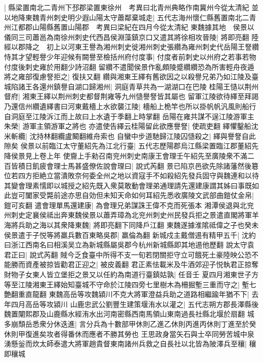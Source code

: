 |{
	縣梁置南北二青州下邳郡梁置東徐州　考異曰北青州典略作南冀州今從太清紀}
並以地降東魏青州刺史明少遐山陽太守蕭鄰棄城走|{
	五代志海州懷仁縣舊置南北二青州江都郡山陽縣舊置山陽郡　考異曰梁紀在四月今從太清紀}
東魏據其地　侯景以儀同三司蕭邕為南徐州刺史代西昌侯淵藻鎮京口又遣其將徐相攻晉陵|{
	將即亮翻}
陸經以郡降之　初上以河東王譽為湘州刺史徙湘州刺史張纘為雍州刺史代岳陽王詧纘恃其才望輕譽少年迎候有闕譽至檢括州府付度事|{
	付度者前刺史以州府之若事若物付度後刺史雍於用翻少詩沼翻}
留纘不遣聞侯景作亂頗陵蹙纘纘恐為所害輕舟夜遁將之雍部復慮詧拒之|{
	復扶又翻}
纘與湘東王繹有舊欲因之以殺譽兄弟乃如江陵及臺城陷諸王各還州鎮譽自湖口歸湘州|{
	洞庭青草共為一湖湖口在巴陵}
桂陽王慥以荆州督府|{
	湘東王繹以荆州刺史都督荆雍等九州慥譽詧皆其屬也}
留軍江陵欲待繹至拜謁乃還信州纘遺繹書曰河東戴檣上水欲襲江陵|{
	檣船上桅竿也所以掛帆帆汎風則船行自洞庭至江陵泝江而上故曰上水遺于季翻上時掌翻}
岳陽在雍共謀不逞江陵游軍主朱榮|{
	游軍主領游軍之將也}
亦遣使告繹云桂陽留此欲應譽詧|{
	使疏吏翻}
繹懼鑿船沈米斬纜|{
	沈持林翻纜盧闞翻維舟索也}
自蠻中步道馳歸江陵囚慥殺之|{
	繹與譽詧自此隙矣}
侯景以前臨江太守董紹先為江北行臺|{
	五代志歷陽郡烏江縣梁置臨江郡董紹先降侯景見上卷上年}
使齎上手勑召南兖州刺史南康王會理壬午紹先至廣陵衆不滿二百皆積日飢疲會理士馬甚盛僚佐說會理曰|{
	說式芮翻}
景已陷京邑欲先除諸藩然後簒位若四方拒絶立當潰敗奈何委全州之地以資寇手不如殺紹先發兵固守與魏連和以待其變會理素懦即以城授之紹先既入衆莫敢動會理弟通理請先還建康謂其姊曰事既如此豈可闔家受斃前途亦思自効但未知天命如何耳紹先悉收廣陵文武部曲鎧仗金帛|{
	鎧可亥翻}
遣會理單馬還建康|{
	為會理兄弟謀誅王偉不克而死張本}
湘潭侯退與北兖州刺史定襄侯祗出奔東魏侯景以蕭弄璋為北兖州刺史州民發兵拒之景遣直閣將軍羊海將兵助之海以其衆降東魏|{
	將即亮翻下同降戶江翻}
東魏遂據淮隂祗偉之子也癸未侯景遣于子悦等將羸兵數百東略吳郡|{
	羸倫為翻}
新城戍主戴僧逷有精甲五千|{
	沈約曰浙江西南名曰相溪吴立為新城縣屬吳郡今杭州新城縣即其地逷他歷翻}
說太守袁君正曰|{
	說式芮翻}
賊今乏食臺中所得不支一旬若閉關拒守立可餓死土豪陸映公恐不能勝而資產被掠皆勸君正迎之|{
	被皮義翻}
君正素怯載米及牛酒郊迎子悦執君正掠奪財物子女東人皆立堡拒之景又以任約為南道行臺鎮姑孰|{
	任音壬}
夏四月湘東世子方等至江陵湘東王繹始知臺城不守命於江陵四旁七里樹木為柵掘塹三重而守之|{
	塹七艶翻重直龍翻}
東魏高岳等攻魏潁川不克大將軍澄益兵助之道路相繼踰年猶不下|{
	去年四月高岳等攻潁川}
山鹿忠武公劉豐生建策堰洧水以灌之|{
	五代志朔方郡長澤縣後魏置闡熙郡及山鹿縣水經洧水出河南密縣西南馬領山東南過長社縣北堰於扇翻}
城多崩頹岳悉衆分休迭進|{
	言分兵為十數部甲休則乙進乙休則丙進丙休則丁進至於癸休則甲復進矣攻者得番休而應者不勝其勞也}
王思政身當矢石與士卒同勞苦城中泉湧懸釡而炊太師泰遣大將軍趙貴督東南諸州兵救之自長社以北皆為陂澤兵至穰|{
	穰即穰城}
